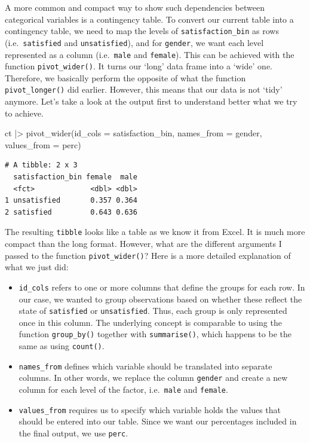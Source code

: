 \documentclass[
  letterpaper,
]{krantz}
\makeatletter
\newenvironment{Shaded}{\begin{snugshade}}{\end{snugshade}}
\newcommand{\AttributeTok}[1]{\textcolor[rgb]{0.40,0.45,0.13}{#1}}
\newcommand{\FunctionTok}[1]{\textcolor[rgb]{0.28,0.35,0.67}{#1}}
\newcommand{\NormalTok}[1]{\textcolor[rgb]{0.00,0.23,0.31}{#1}}
\newcommand{\SpecialCharTok}[1]{\textcolor[rgb]{0.37,0.37,0.37}{#1}}
\newenvironment{kframe}{%
\medskip{}
\setlength{\fboxsep}{.8em}
 \def\at@end@of@kframe{}%
 \ifinner\ifhmode%
  \def\at@end@of@kframe{\end{minipage}}%
  \begin{minipage}{\columnwidth}%
 \fi\fi%
 \def\FrameCommand##1{\hskip\@totalleftmargin \hskip-\fboxsep
 \colorbox{shadecolor}{##1}\hskip-\fboxsep
     \hskip-\linewidth \hskip-\@totalleftmargin \hskip\columnwidth}%
 \MakeFramed {\advance\hsize-\width
   \@totalleftmargin\z@ \linewidth\hsize
   \@setminipage}}%
 {\par\unskip\endMakeFramed%
 \at@end@of@kframe}
\renewenvironment{Shaded}{\begin{kframe}}{\end{kframe}}
\makeatother
\begin{document}
A more common and compact way to show such dependencies between
categorical variables is a contingency table. To convert our current
table into a contingency table, we need to map the levels of
\texttt{satisfaction\_bin} as rows (i.e.~\texttt{satisfied} and
\texttt{unsatisfied}), and for \texttt{gender}, we want each level
represented as a column (i.e.~\texttt{male} and \texttt{female}). This
can be achieved with the function \texttt{pivot\_wider()}. It turns our
`long' data frame into a `wide' one. Therefore, we basically perform the
opposite of what the function \texttt{pivot\_longer()} did earlier.
However, this means that our data is not `tidy' anymore. Let's take a
look at the output first to understand better what we try to achieve.

\begin{Shaded}
\begin{Highlighting}[]
\NormalTok{ct }\SpecialCharTok{|\textgreater{}} \FunctionTok{pivot\_wider}\NormalTok{(}\AttributeTok{id\_cols =}\NormalTok{ satisfaction\_bin,}
                   \AttributeTok{names\_from =}\NormalTok{ gender,}
                   \AttributeTok{values\_from =}\NormalTok{ perc)}
\end{Highlighting}
\end{Shaded}

\begin{verbatim}
# A tibble: 2 x 3
  satisfaction_bin female  male
  <fct>             <dbl> <dbl>
1 unsatisfied       0.357 0.364
2 satisfied         0.643 0.636
\end{verbatim}

The resulting \texttt{tibble} looks like a table as we know it from
Excel. It is much more compact than the long format. However, what are
the different arguments I passed to the function
\texttt{pivot\_wider()}? Here is a more detailed explanation of what we
just did:

\begin{itemize}
\item
  \texttt{id\_cols} refers to one or more columns that define the groups
  for each row. In our case, we wanted to group observations based on
  whether these reflect the state of \texttt{satisfied} or
  \texttt{unsatisfied}. Thus, each group is only represented once in
  this column. The underlying concept is comparable to using the
  function \texttt{group\_by()} together with \texttt{summarise()},
  which happens to be the same as using \texttt{count()}.
\item
  \texttt{names\_from} defines which variable should be translated into
  separate columns. In other words, we replace the column
  \texttt{gender} and create a new column for each level of the factor,
  i.e.~\texttt{male} and \texttt{female}.
\item
  \texttt{values\_from} requires us to specify which variable holds the
  values that should be entered into our table. Since we want our
  percentages included in the final output, we use \texttt{perc}.
\end{itemize}
\end{document}
